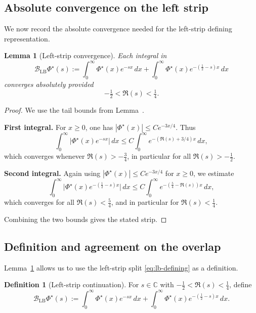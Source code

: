 \documentclass[11pt]{amsart}
\newtheorem{lemma}[theorem]{Lemma}
\theoremstyle{definition}
\newtheorem{definition}[theorem]{Definition}
\theoremstyle{remark}
\newcommand{\C}{\mathbb{C}}
\begin{document}
\subsection{Absolute convergence on the left strip}

We now record the absolute convergence needed for the left-strip defining representation.

\begin{lemma}[Left-strip convergence]
\label{lem:left-strip-convergence}
Each integral in
\begin{equation}\label{eq:lb-defining}
\mathcal B_{\mathrm{LB}}\Phi^{\star}(s)
:=
\int_{0}^{\infty}\Phi^{\star}(x)e^{-sx}\,dx
+
\int_{0}^{\infty}\Phi^{\star}(x)e^{-(\frac12-s)x}\,dx
\end{equation}
converges absolutely provided
\[
-\tfrac12<\Re(s)<\tfrac14.
\]
\end{lemma}

\begin{proof}
We use the tail bounds from Lemma~\cite{PaperI}.

\smallskip
\noindent\textbf{First integral.}
For $x\ge0$, one has $|\Phi^{\star}(x)|\le C e^{-3x/4}$. Thus
\[
\int_{0}^{\infty}\bigl|\Phi^{\star}(x)e^{-sx}\bigr|\,dx
\le
C\int_{0}^{\infty}e^{-(\Re(s)+3/4)x}\,dx,
\]
which converges whenever $\Re(s)>-\tfrac34$, in particular for all
$\Re(s)>-\tfrac12$.

\smallskip
\noindent\textbf{Second integral.}
Again using $|\Phi^{\star}(x)|\le C e^{-3x/4}$ for $x\ge0$, we estimate
\[
\int_{0}^{\infty}\bigl|\Phi^{\star}(x)e^{-(\frac12-s)x}\bigr|\,dx
\le
C\int_{0}^{\infty}e^{-(\frac54-\Re(s))x}\,dx,
\]
which converges for all $\Re(s)<\tfrac54$, and in particular for
$\Re(s)<\tfrac14$.

Combining the two bounds gives the stated strip.
\end{proof}
\subsection{Definition and agreement on the overlap}

Lemma~\ref{lem:left-strip-convergence} allows us to use the left-strip split
\eqref{eq:lb-defining} as a definition.

\begin{definition}[Left-strip continuation]
\label{def:left-strip}
For $s\in\C$ with $-\tfrac12<\Re(s)<\tfrac14$, define
\begin{equation}
\label{eq:left-strip-def}
\mathcal B_{\mathrm{LB}}\Phi^{\star}(s)
:=
\int_{0}^{\infty}\Phi^{\star}(x)e^{-sx}\,dx
+
\int_{0}^{\infty}\Phi^{\star}(x)e^{-(\frac12-s)x}\,dx.
\end{equation}
\end{definition}
\end{document}
